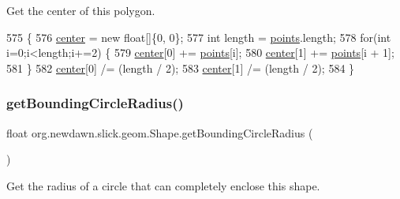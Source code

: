 Get the center of this polygon. 
\begin{DoxyCode}
575                                 \{
576         \mbox{\hyperlink{classorg_1_1newdawn_1_1slick_1_1geom_1_1_shape_a15ecde3336c4310cd927d766bb9a0b3b}{center}} = \textcolor{keyword}{new} \textcolor{keywordtype}{float}[]\{0, 0\};
577         \textcolor{keywordtype}{int} length = \mbox{\hyperlink{classorg_1_1newdawn_1_1slick_1_1geom_1_1_shape_a8b4d4058734bbb3b96072e470b92aa37}{points}}.length;
578         \textcolor{keywordflow}{for}(\textcolor{keywordtype}{int} i=0;i<length;i+=2) \{
579             \mbox{\hyperlink{classorg_1_1newdawn_1_1slick_1_1geom_1_1_shape_a15ecde3336c4310cd927d766bb9a0b3b}{center}}[0] += \mbox{\hyperlink{classorg_1_1newdawn_1_1slick_1_1geom_1_1_shape_a8b4d4058734bbb3b96072e470b92aa37}{points}}[i];
580             \mbox{\hyperlink{classorg_1_1newdawn_1_1slick_1_1geom_1_1_shape_a15ecde3336c4310cd927d766bb9a0b3b}{center}}[1] += \mbox{\hyperlink{classorg_1_1newdawn_1_1slick_1_1geom_1_1_shape_a8b4d4058734bbb3b96072e470b92aa37}{points}}[i + 1];
581         \}
582         \mbox{\hyperlink{classorg_1_1newdawn_1_1slick_1_1geom_1_1_shape_a15ecde3336c4310cd927d766bb9a0b3b}{center}}[0] /= (length / 2);
583         \mbox{\hyperlink{classorg_1_1newdawn_1_1slick_1_1geom_1_1_shape_a15ecde3336c4310cd927d766bb9a0b3b}{center}}[1] /= (length / 2);
584     \}
\end{DoxyCode}
\mbox{\label{classorg_1_1newdawn_1_1slick_1_1geom_1_1_shape_afe63c86e48173e5a6b742ccf1ac86e19}} 
\subsubsection{\texorpdfstring{get\+Bounding\+Circle\+Radius()}{getBoundingCircleRadius()}}
{\footnotesize\ttfamily float org.\+newdawn.\+slick.\+geom.\+Shape.\+get\+Bounding\+Circle\+Radius (\begin{DoxyParamCaption}{ }\end{DoxyParamCaption})\hspace{0.3cm}{\ttfamily [inline]}}

Get the radius of a circle that can completely enclose this shape.

